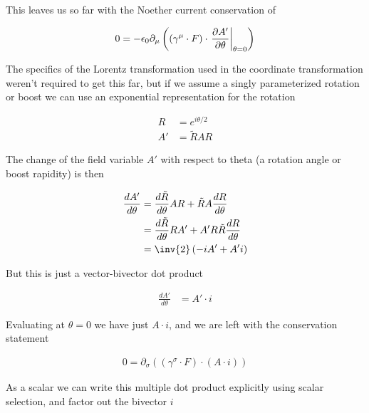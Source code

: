 
This leaves us so far with the Noether current conservation of

\begin{align}\label{eqn:rotationCurrents:goo6}
0 = -\epsilon_0 \partial_\mu \left( (\gamma^\mu \cdot F) \cdot {\left. \frac{\partial {A'}}{\partial {\theta}} \right\vert}_{\theta=0}  \right)
\end{align}

The specifics of the Lorentz transformation used in the coordinate transformation weren't required to get this far, but if we assume a singly parameterized rotation or boost we can use an exponential representation for the rotation

\begin{align}\label{eqn:rotationCurrents:goo7}
R &= e^{i\theta/2} \\
A' &= \tilde{R} A R
\end{align}

The change of the field variable $A'$ with respect to theta (a rotation angle or boost rapidity) is then

\begin{align*}
\frac{dA'}{d\theta}
&= \frac{d\tilde{R}}{d\theta} A R + \tilde{R} A \frac{d R}{d\theta} \\
&= \frac{d\tilde{R}}{d\theta} R A' + A' R \tilde{R} \frac{d R}{d\theta} \\
&= \inv{2} \left( -i A' + A' i \right) \\
\end{align*}

But this is just a vector-bivector dot product

\begin{align}\label{eqn:rotationCurrents:goo8}
\frac{dA'}{d\theta} &= A' \cdot i
\end{align}

Evaluating at $\theta = 0$ we have just $A \cdot i$, and we are left with the conservation statement

\begin{align}\label{eqn:rotationCurrents:goo9}
0 = \partial_\sigma \left( (\gamma^\sigma \cdot F) \cdot (A \cdot i) \right)
\end{align}

As a scalar we can write this multiple dot product explicitly using scalar selection, and factor out the bivector $i$

